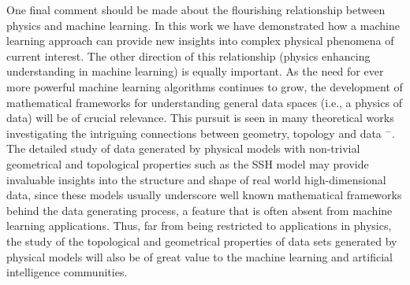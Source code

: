 \documentclass[10pt]{revtex4-1}
\begin{document}
One final comment should be made about the flourishing relationship between physics and machine learning. In this work we have demonstrated how a machine learning approach can provide new insights into complex physical phenomena of current interest. The other direction of this relationship (physics enhancing understanding in machine learning) is equally important. As the need for ever more powerful machine learning algorithms continues to grow, the development of mathematical frameworks for understanding general data spaces (i.e., a physics of data) will be of crucial relevance. This pursuit is seen in many theoretical works investigating the intriguing connections between geometry, topology and data \cite{carlsson2009topology}$^-$\cite{belkin2003problems}. The detailed study of data generated by physical models with non-trivial geometrical and topological properties such as the SSH model may provide invaluable insights into the structure and shape of real world high-dimensional data, since these models usually underscore well known mathematical frameworks behind the data generating process, a feature that is often absent from machine learning applications. Thus, far from being restricted to applications in physics, the study of the topological and geometrical properties of data sets generated by physical models will also be of great value to the machine learning and artificial intelligence communities.  
\end{document}
